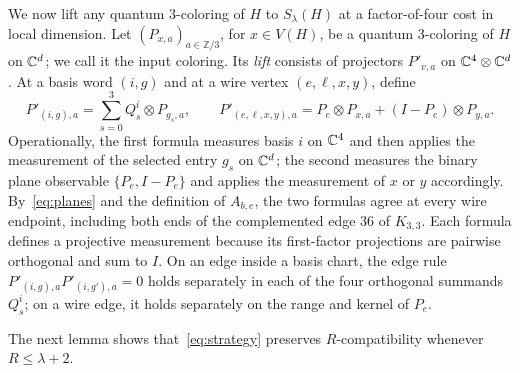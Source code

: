 We now lift any quantum $3$-coloring of $H$ to $S_\lambda(H)$ at a factor-of-four cost in local dimension. Let $(P_{x,a})_{a\in\mathbb Z/3}$, for $x\in V(H)$, be a quantum $3$-coloring of $H$ on $\mathbb C^d$; we call it the input coloring. Its \emph{lift} consists of projectors $P'_{v,a}$ on $\mathbb C^4\otimes\mathbb C^d$. At a basis word $(i,g)$ and at a wire vertex $(e,\ell,x,y)$, define
\begin{equation}\label{eq:strategy}
 P'_{(i,g),a}=\sum_{s=0}^3 Q^i_s\otimes P_{g_s,a},
 \qquad
 P'_{(e,\ell,x,y),a}
 =P_e\otimes P_{x,a}+(I-P_e)\otimes P_{y,a}.
\end{equation}
Operationally, the first formula measures basis $i$ on $\mathbb C^4$ and then applies the measurement of the selected entry $g_s$ on $\mathbb C^d$; the second measures the binary plane observable $\{P_e,I-P_e\}$ and applies the measurement of $x$ or $y$ accordingly. By~\eqref{eq:planes} and the definition of $A_{b,e}$, the two formulas agree at every wire endpoint, including both ends of the complemented edge $36$ of $K_{3,3}$. Each formula defines a projective measurement because its first-factor projections are pairwise orthogonal and sum to $I$. On an edge inside a basis chart, the edge rule $P'_{(i,g),a}P'_{(i,g'),a}=0$ holds separately in each of the four orthogonal summands $Q^i_s$; on a wire edge, it holds separately on the range and kernel of $P_e$.

The next lemma shows that~\eqref{eq:strategy} preserves $R$-compatibility whenever $R\le\lambda+2$.

